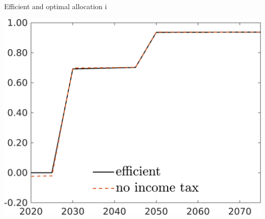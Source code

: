 \documentclass[11pt,aspectratio=169]{beamer}
\begin{document}
\begin{frame}{Efficient and optimal allocation i}
	\centering
	\begin{minipage}[]{0.32\textwidth}
		\includegraphics[width=1\textwidth]{../codding_model/own_basedOnFried/optimalPol_elastS_DisuSci/figures/all_1705/tauf_CompEffOPT_T_NoTaus_noopt_spillover0_noskill0_sep1_BN0_ineq0_red0_xgrowth0_zero0_countec0_etaa0.79_lgd1.png}
	\end{minipage}
\begin{minipage}[]{0.05\textwidth}
	\ \ \\ 
	\ \ 
\end{minipage}
	\begin{minipage}[]{0.32\textwidth}

\end{minipage}
\end{frame}
\end{document}
